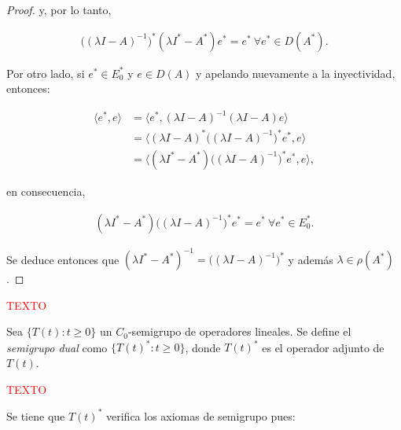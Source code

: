 \begin{proof}
    y, por lo tanto,

    \begin{align*}
        \big( (\lambda I - A)^{-1} \big )^*(\lambda I^* - A^*)e^* = e^* \ \forall e^* \in D(A^*).
    \end{align*}

    Por otro lado, si $e^* \in E_0^*$ y $e \in D(A)$ y apelando nuevamente a la inyectividad, entonces:

    \begin{align*}
        \langle e^*, e \rangle &= \langle e^*, (\lambda I - A)^{-1}(\lambda I - A) e \rangle\\
        &= \Big\langle (\lambda I - A)^* \big( (\lambda I - A)^{-1} \big)^* e^*, e \Big\rangle\\
        &= \Big\langle (\lambda I^* - A^*) \big( (\lambda I - A)^{-1} \big)^* e^*, e \Big\rangle,
    \end{align*}

    en consecuencia,

    \begin{align*}
        (\lambda I^* - A^*)\big( (\lambda I - A)^{-1} \big )^* e^* = e^* \ \forall e^* \in E_0^*.
    \end{align*}

    Se deduce entonces que $(\lambda I^* - A^*)^{-1} = \big((\lambda I - A)^{-1}\big)^*$ y además $\lambda \in \rho(A^*)$.
\end{proof}

\textcolor{red}{TEXTO}\\

\begin{Definicion}
    \label{ch:semigrupos:section:dual:def:sgDual}

    Sea $\{T(t) : t \geq 0\}$ un $C_0$-semigrupo de operadores lineales. Se define el \textit{semigrupo dual} como $\{T(t)^* : t \geq 0\}$, donde $T(t)^*$ es el operador adjunto de $T(t)$.
\end{Definicion}

\textcolor{red}{TEXTO}

Se tiene que $T(t)^*$ verifica los axiomas de semigrupo pues:

